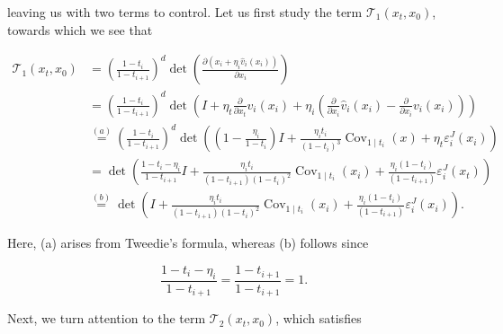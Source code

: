 \documentclass{article}
\theoremstyle{plain}
\theoremstyle{definition}
\theoremstyle{remark}
\begin{document}
leaving us with two terms to control.
Let us first study the term $\mathcal{T}_{1}\left(x_{t}, x_{0}\right)$, towards which we see that

\begin{align*}
\mathcal{T}_{1}\left(x_{t}, x_{0}\right) & =\left(\frac{1-t_i}{1-t_{i+1}}\right)^{d} \operatorname{det}\left(\frac{\partial (x_i + \eta_i \widehat v_i(x_i))}{\partial x_{i}}\right) \\
& =\left(\frac{1-t_i}{1-t_{i+1}}\right)^{d} \operatorname{det}\left(I+\eta_{t} \frac{\partial}{\partial x_{t}} v_i\left(x_{i}\right)+\eta_{i}\left(\frac{\partial}{\partial x_{i}} \widehat v_{i}\left(x_{i}\right)-\frac{\partial}{\partial x_{i}} v_{i}\left(x_{i}\right)\right)\right) \\
& \stackrel{(a)}{=}\left(\frac{1-t_i}{1-t_{i+1}}\right)^{d} \operatorname{det}\left(\left(1-\frac{\eta_{i}}{1-t_i}\right) I+\frac{ \eta_{i} t_i}{(1-t_i)^3} \operatorname{Cov}_{1 \mid t_i}(x)+\eta_{t} \varepsilon_i^{J}\left(x_{i}\right)\right)  \\
& =\operatorname{det}\left(\frac{1 - t_i - \eta_i}{1 - t_{i+1}} I+ \frac{\eta_i t_i}{(1-t_{i+1}) (1-t_i)^2} \operatorname{Cov}_{1 \mid t_i}\left(x_{i}\right)+ \frac{\eta_i(1-t_i)}{(1-t_{i+1})} \varepsilon_i^{J}\left(x_{t}\right)\right)
\\
& \stackrel{(b)}{=} \operatorname{det}\left( I+ \frac{\eta_i t_i}{(1-t_{i+1}) (1-t_i)^2} \operatorname{Cov}_{1 \mid t_i}\left(x_{i}\right)+ \frac{\eta_i(1-t_i)}{(1-t_{i+1})} \varepsilon_i^{J}\left(x_{i}\right)\right).
\end{align*}


 Here, (a) arises from Tweedie's formula, whereas (b) follows since

\begin{equation*}
\frac{1 - t_i - \eta_i}{1 - t_{i+1}} = \frac{1 -t_{i+1}}{1 -t_{i+1}} = 1.
\end{equation*}


Next, we turn attention to the term $\mathcal{T}_{2}\left(x_{t}, x_{0}\right)$, which satisfies
\end{document}

